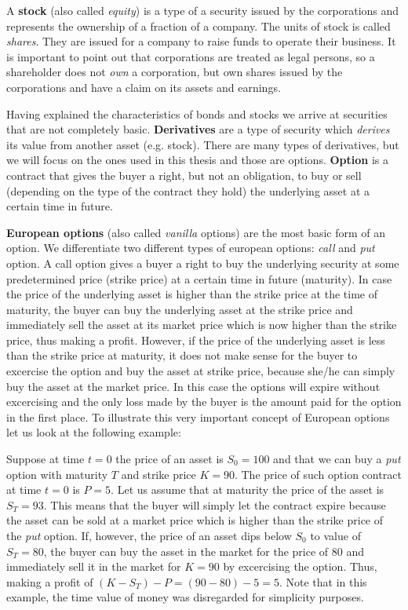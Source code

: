 \documentclass[times, utf8, diplomski]{fer}
\begin{document}
\hfill \break
A \textbf{stock} (also called \textit{equity}) is a type of a security issued by the corporations and represents the ownership of a fraction of a company. The units of stock is called \textit{shares}. They are issued for a company to raise funds to operate their business. It is important to point out that corporations are treated as legal persons, so a shareholder does not \textit{own} a corporation, but own shares issued by the corporations and have a claim on its assets and earnings.

\hfill \break
Having explained the characteristics of bonds and stocks we arrive at securities that are not completely basic. \textbf{Derivatives} are a type of security which \textit{derives} its value from another asset (e.g. stock). There are many types of derivatives, but we will focus on the ones used in this thesis and those are options. \textbf{Option} is a contract that gives the buyer a right, but not an obligation, to buy or sell (depending on the type of the contract they hold) the underlying asset at a certain time in future. 

\hfill \break
\textbf{European options} (also called \textit{vanilla} options) are the most basic form of an option. We differentiate two different types of european options: \textit{call} and \textit{put} option. A call option gives a buyer a right to buy the underlying security at some predetermined price (strike price) at a certain time in future (maturity). In case the price of the underlying asset is higher than the strike price at the time of maturity, the buyer can buy the underlying asset at the strike price and immediately sell the asset at its market price which is now higher than the strike price, thus making a profit. However, if the price of the underlying asset is less than the strike price at maturity, it does not make sense for the buyer to excercise the option and buy the asset at strike price, because she/he can simply buy the asset at the market price. In this case the options will expire without excercising and the only loss made by the buyer is the amount paid for the option in the first place. To illustrate this very important concept of European options let us look at the following example:

\hfill \break
\noindent Suppose at time $t=0$ the price of an asset is $S_0 = 100$ and that we can buy a \textit{put} option with maturity $T$ and strike price $K=90$. The price of such option contract at time $t=0$ is $P = 5$. Let us assume that at maturity the price of the asset is $S_T = 93$. This means that the buyer will simply let the contract expire because the asset can be sold at a market price which is higher than the strike price of the \textit{put} option. If, however, the price of an asset dips below $S_0$ to value of $S_T = 80$, the buyer can buy the asset in the market for the price of $80$ and immediately sell it in the market for $K=90$ by excercising the option. Thus, making a profit of $(K-S_T) - P = (90 - 80) - 5 = 5$. 
\hfill \break
Note that in this example, the time value of money was disregarded for simplicity purposes. 
\end{document}
